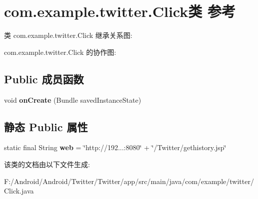 \hypertarget{classcom_1_1example_1_1twitter_1_1_click}{}\section{com.\+example.\+twitter.\+Click类 参考}
\label{classcom_1_1example_1_1twitter_1_1_click}


类 com.\+example.\+twitter.\+Click 继承关系图\+:


com.\+example.\+twitter.\+Click 的协作图\+:
\subsection*{Public 成员函数}
\begin{DoxyCompactItemize}
\item 
\mbox{\label{classcom_1_1example_1_1twitter_1_1_click_a9a134fa4b90a8c97682c4ace846656c9}} 
void {\bfseries on\+Create} (Bundle saved\+Instance\+State)
\end{DoxyCompactItemize}
\subsection*{静态 Public 属性}
\begin{DoxyCompactItemize}
\item 
\mbox{\label{classcom_1_1example_1_1twitter_1_1_click_a1030f163890f87e3f8c5c1443023271e}} 
static final String {\bfseries web} = \char`\"{}http\+://192...\+:8080\char`\"{} + \char`\"{}/Twitter/gethistory.\+jsp\char`\"{}
\end{DoxyCompactItemize}


该类的文档由以下文件生成\+:\begin{DoxyCompactItemize}
\item 
F\+:/\+Android/\+Android/\+Twitter/\+Twitter/app/src/main/java/com/example/twitter/Click.\+java\end{DoxyCompactItemize}
